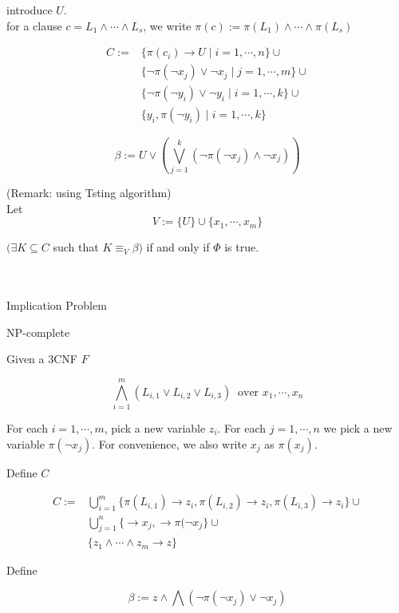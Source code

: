 \documentclass[12pt]{article}
\begin{document}
introduce $U$.\\

for a clause $c=L_1\wedge\cdots\wedge L_s$, we write 
$\pi(c):=\pi(L_1)\wedge\cdots\wedge \pi(L_s)$





$$\begin{array}{ll}C:=&\{\pi(c_i)\rightarrow U\mid i=1,\cdots,n\}\cup\\ 
&\{\neg \pi(\neg x_j)\vee \neg x_j\mid j=1,\cdots,m\}\cup\\

&\{\neg \pi(\neg y_i)\vee \neg y_i\mid i=1,\cdots, k\}\cup\\
&\{y_i,\pi(\neg y_i)\mid i=1,\cdots,k\}\end{array}$$


$$\beta:= U\vee \left(\bigvee_{j=1}^k (\neg \pi(\neg x_j)\wedge \neg x_j)\right)$$


(Remark: using Tsting algorithm) \\

Let $$V:=\{U\}\cup\{x_1,\cdots,x_m\}$$

$(\exists K\subseteq C$ such that $K\equiv_V \beta)$ if and only if $\Phi$ is true.

\ \\

\ \\

Implication Problem

NP-complete  

Given a 3CNF  $F$

$$\bigwedge_{i=1}^m (L_{i,1}\vee L_{i,2}\vee L_{i,3}) \ \mbox{ over } x_1,\cdots, x_n$$

For each $i=1,\cdots,m$, pick a new variable $z_i$. For each $j=1,\cdots, n$ we pick a new variable $\pi(\neg x_j)$. For convenience, we also write $x_j$ as $\pi(x_j)$. 

Define $C$ 

$$\begin{array}{ll}C:=&
\bigcup_{i=1}^m\{\pi(L_{i,1})\rightarrow z_i, \pi(L_{i,2})\rightarrow z_i, \pi(L_{i,3})\rightarrow z_i\}\cup\\ & \bigcup_{j=1}^n\{\rightarrow x_j, \rightarrow \pi(\neg x_j\} \cup\\ &
\{z_1\wedge\cdots\wedge z_m\rightarrow z\}\end{array}$$

Define 

$$\beta:=z\wedge\bigwedge (\neg \pi(\neg x_j)\vee \neg x_j)$$
\end{document}
